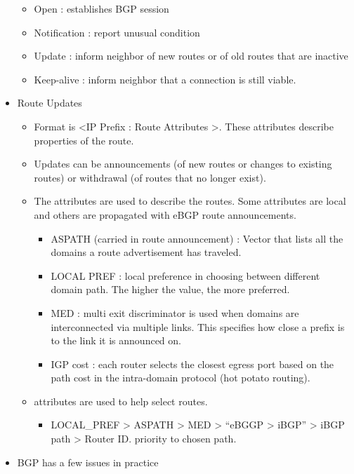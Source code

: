 \documentclass[]{article}
\providecommand{\tightlist}{%
  \setlength{\itemsep}{0pt}\setlength{\parskip}{0pt}}
\begin{document}
\begin{itemize}
  \begin{itemize}
  \tightlist
  \item
    Open : establishes BGP session
  \item
    Notification : report unusual condition
  \item
    Update : inform neighbor of new routes or of old routes that are
    inactive
  \item
    Keep-alive : inform neighbor that a connection is still viable.
  \end{itemize}
\item
  Route Updates

  \begin{itemize}
  \tightlist
  \item
    Format is \textless{}IP Prefix : Route Attributes \textgreater{}.
    These attributes describe properties of the route.
  \item
    Updates can be announcements (of new routes or changes to existing
    routes) or withdrawal (of routes that no longer exist).
  \item
    The attributes are used to describe the routes. Some attributes are
    local and others are propagated with eBGP route announcements.

    \begin{itemize}
    \tightlist
    \item
      ASPATH (carried in route announcement) : Vector that lists all the
      domains a route advertisement has traveled.
    \item
      LOCAL PREF : local preference in choosing between different domain
      path. The higher the value, the more preferred.
    \item
      MED : multi exit discriminator is used when domains are
      interconnected via multiple links. This specifies how close a
      prefix is to the link it is announced on.
    \item
      IGP cost : each router selects the closest egress port based on
      the path cost in the intra-domain protocol (hot potato routing).
    \end{itemize}
  \item
    attributes are used to help select routes.

    \begin{itemize}
    \tightlist
    \item
      LOCAL\_PREF \textgreater{} ASPATH \textgreater{} MED
      \textgreater{} ``eBGGP \textgreater{} iBGP'' \textgreater{} iBGP
      path \textgreater{} Router ID. priority to chosen path.
    \end{itemize}
  \end{itemize}
\item
  BGP has a few issues in practice


\end{itemize}
\end{document}
